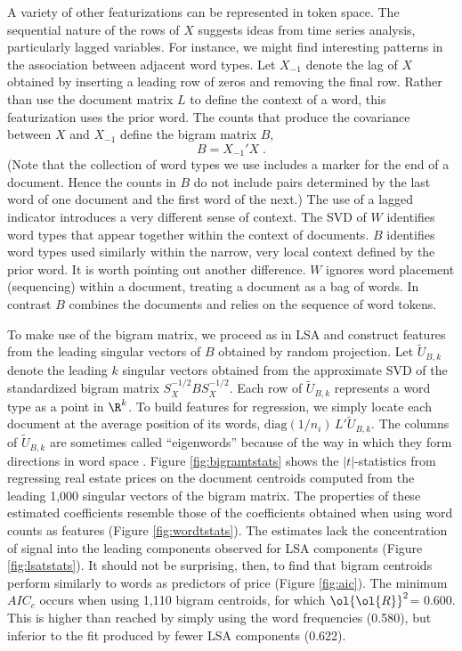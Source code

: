 \documentclass[12pt]{article}
\newcommand{\prs}{\mbox{$\ol{\ol{R}}^2$}}
\begin{document}
A variety of other featurizations can be represented in token space. The sequential nature of the rows of $X$ suggests ideas from time series analysis, particularly lagged variables.  For instance, we might find interesting patterns in the association between adjacent word types.  Let $X_{-1}$ denote the lag of $X$ obtained by inserting a leading row of zeros and removing the final row.  Rather than use the document matrix $L$ to define the context of a word, this featurization uses the prior word.  The counts that produce the covariance between $X$ and $X_{-1}$ define the bigram matrix $B$,
 \begin{equation}
   B = X_{-1}' X   \;.
  \label{eq:B}
\end{equation}
(Note that the collection of word types we use includes a marker for the end of a document. Hence the counts in $B$ do not include pairs determined by the last word of one document and the first word of the next.) The use of a lagged indicator introduces a very different sense of context.  The SVD of $W$ identifies word types that appear together within the context of documents.  $B$ identifies word types used similarly within the narrow, very local context defined by the prior word. It is worth pointing out another difference.  $W$ ignores word placement (sequencing) within a document, treating a document as a bag of words.  In contrast $B$ combines the documents and relies on the sequence of word tokens. 

 
To make use of the bigram matrix, we proceed as in LSA and construct features from the leading singular vectors of $B$ obtained by random projection.  Let $\widetilde{U}_{B,k}$ denote the leading $k$ singular vectors obtained from the approximate SVD of the standardized bigram matrix $S_X^{-1/2} B S_X^{-1/2}$.   Each row of $\widetilde{U}_{B,k}$ represents a word type as a point in $\R^k$.   To build features for regression, we simply locate each document at the average position of its words, $\mbox{diag}(1/n_i)\,L'\widetilde{U}_{B,k}$.
The columns of  $\widetilde{U}_{B,k}$ are sometimes called ``eigenwords'' because of the way in which they form directions in word space .  Figure \ref{fig:bigramtstats} shows the $|t|$-statistics from regressing real estate prices on the document centroids computed from the leading 1,000 singular vectors of the bigram matrix.  The properties of these estimated coefficients resemble those of the coefficients obtained when using word counts as features (Figure \ref{fig:wordtstats}).  The estimates lack the concentration of signal into the leading components observed for LSA components (Figure \ref{fig:lsatstats}).  It should not be surprising, then, to find that bigram centroids perform similarly to words as predictors of price (Figure \ref{fig:aic}).  The minimum $AIC_c$ occurs when using 1,110 bigram centroids, for which \prs = 0.600.  This is higher than reached by simply using the word frequencies (0.580), but inferior to the fit produced by fewer LSA components (0.622).
\end{document}
